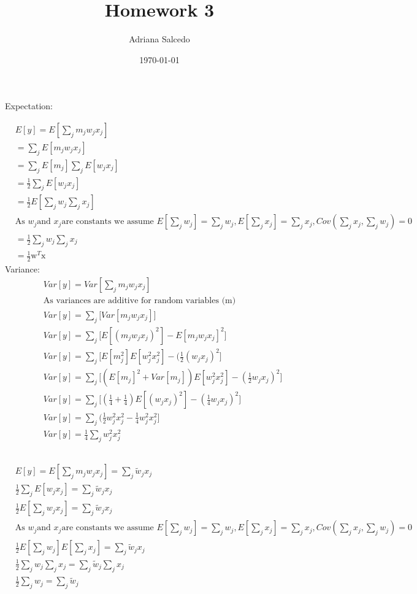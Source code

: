 \documentclass[12pt,letterpaper]{article} %
\title{\Large Homework 3}
\author{\large Adriana Salcedo}
\date{\large \today}
\newcommand{\bs}[1]{\bm{\mathrm{#1}}} %
\newcommand{\sumj}{\sum_j}
\begin{document}
\maketitle
\section{}
\subsection{}
Expectation:

\begin{align}
&E[y] = E[\sum_j m_jw_jx_j] \\
&= \sum_jE[m_jw_jx_j]\\
&= \sum_jE[m_j]\sumj E[w_jx_j]\\
&=\frac{1}{2}\sumj E[w_jx_j]\\
&=\frac{1}{2}E[\sumj w_j\sumj x_j]\\
&\text{As } w_j \text{and } x_j \text{are constants we assume }E[\sumj w_j]=\sumj w_j, E[\sumj x_j]=\sumj x_j, Cov(\sumj x_j,\sumj w_j) = 0\\
&=\frac{1}{2}\sumj w_j \sumj x_j\\
&=\frac{1}{2}\bs{w}^T\bs{x}
\end{align}
Variance:
\begin{align}
&Var[y] = Var[\sum_j m_jw_jx_j] \\
&\text{As variances are additive for random variables (m)}\\
&Var[y] = \sumj\big[ Var[m_jw_jx_j]\big] \\
&Var[y] = \sumj\big[ E[(m_jw_jx_j)^2] - E[m_jw_jx_j]^2\big] \\
&Var[y] = \sumj\big[ E[m_j^2]E[w_j^2x_j^2] - (\frac{1}{2}(w_jx_j)^2\big] \\
&Var[y] = \sumj\big[(E[m_j]^2+Var[m_j])E[w_j^2x_j^2] - (\frac{1}{2}w_jx_j)^2\big] \\
&Var[y] = \sumj\big[(\frac{1}{4}+\frac{1}{4})E[(w_jx_j)^2] - (\frac{1}{4}w_jx_j)^2\big] \\
&Var[y] = \sumj\big(\frac{1}{2}w_j^2x_j^2-\frac{1}{4}w_j^2x_j^2\big] \\
&Var[y] = \frac{1}{4}\sumj w_j^2x_j^2 
\end{align}
\subsection{}
\begin{align}
&E[y] = E[\sum_j m_jw_jx_j]= \sumj \tilde{w}_jx_j \\
&\frac{1}{2}\sumj E[w_jx_j]= \sumj \tilde{w}_jx_j \\
&\frac{1}{2}E[\sumj w_jx_j]= \sumj \tilde{w}_jx_j \\
&\text{As } w_j \text{and } x_j \text{are constants we assume }E[\sumj w_j]=\sumj w_j, E[\sumj x_j]=\sumj x_j, Cov(\sumj x_j,\sumj w_j) = 0\\
&\frac{1}{2}E[\sumj w_j]E[\sumj x_j]= \sumj \tilde{w}_jx_j \\
&\frac{1}{2}\sumj w_j\sumj x_j = \sumj \tilde{w}_j \sumj x_j \\
&\frac{1}{2}\sumj w_j = \sumj\tilde{w}_j
\end{align}
\end{document}

